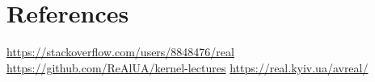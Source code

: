 \documentclass[11pt,a4paper]{moderncv}
\begin{document}
\section{References}

\begin{thebibliography}{9}
 {\color{web} \url{https://stackoverflow.com/users/8848476/real}}
 {\color{web} \url{https://github.com/ReAlUA/kernel-lectures}}
 {\color{web} \url{https://real.kyiv.ua/avreal/}}
\end{thebibliography}
\end{document}
